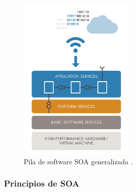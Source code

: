 \begin{figure}
    \centering
    \includegraphics[width=0.5\textwidth]{./imagenes/SOA.png}
    \caption{Pila de software SOA generalizada \cite{soa}.}
    \label{fig:soa_stack}
\end{figure}

\subsubsection{Principios de SOA}


